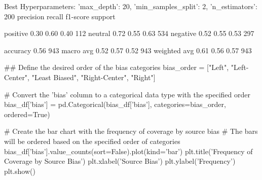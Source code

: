 \begin{pyprint}
Best Hyperparameters: {'max_depth': 20, 'min_samples_split': 2, 'n_estimators': 200}
              precision    recall  f1-score   support

    positive       0.30      0.60      0.40       112
     neutral       0.72      0.55      0.63       534
    negative       0.52      0.55      0.53       297

    accuracy                           0.56       943
   macro avg       0.52      0.57      0.52       943
weighted avg       0.61      0.56      0.57       943
\end{pyprint}


\begin{pyin}
\## Define the desired order of the bias categories
bias_order = ["Left", "Left-Center", "Least Biased", "Right-Center", "Right"]

# Convert the 'bias' column to a categorical data type with the specified order
bias_df['bias'] = pd.Categorical(bias_df['bias'], categories=bias_order, ordered=True)

# Create the bar chart with the frequency of coverage by source bias
# The bars will be ordered based on the specified order of categories
bias_df['bias'].value_counts(sort=False).plot(kind='bar')
plt.title('Frequency of Coverage by Source Bias')
plt.xlabel('Source Bias')
plt.ylabel('Frequency')
plt.show()
\end{pyin}

